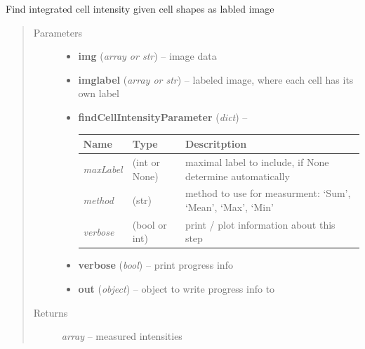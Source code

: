 \documentclass[letterpaper,10pt,english]{sphinxmanual}
\begin{document}
\begin{fulllineitems}
\label{api/ClearMap.ImageProcessing:ClearMap.ImageProcessing.CellSizeDetection.findCellIntensity}
Find integrated cell intensity given cell shapes as labled image
\begin{quote}\begin{description}
\item[{Parameters}] \leavevmode\begin{itemize}
\item {} 
\textbf{img} (\emph{array or str}) --
image data

\item {} 
\textbf{imglabel} (\emph{array or str}) --
labeled image, where each cell has its own label

\item {} 
\textbf{findCellIntensityParameter} (\emph{dict}) --

\begin{tabulary}{\linewidth}{|L|L|L|}
\hline
\textsf{\relax 
Name
} & \textsf{\relax 
Type
} & \textsf{\relax 
Descritption
}\\
\hline
\emph{maxLabel}
 & 
(int or None)
 & 
maximal label to include, if None determine automatically
\\
\hline
\emph{method}
 & 
(str)
 & 
method to use for measurment: `Sum', `Mean', `Max', `Min'
\\
\hline
\emph{verbose}
 & 
(bool or int)
 & 
print / plot information about this step
\\
\hline\end{tabulary}


\item {} 
\textbf{verbose} (\emph{bool}) --
print progress info

\item {} 
\textbf{out} (\emph{object}) --
object to write progress info to

\end{itemize}

\item[{Returns}] \leavevmode
\emph{array} --
measured intensities

\end{description}\end{quote}

\end{fulllineitems}
\end{document}
